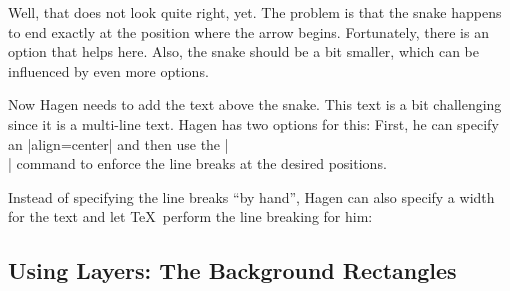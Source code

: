 Well, that does not look quite right, yet. The problem is that the snake
happens to end exactly at the position where the arrow begins. Fortunately,
there is an option that helps here. Also, the snake should be a bit smaller,
which can be influenced by even more options.
%
\begin{codeexample}[preamble={\usetikzlibrary{decorations.pathmorphing}}]
\end{codeexample}

Now Hagen needs to add the text above the snake. This text is a bit challenging
since it is a multi-line text. Hagen has two options for this: First, he can
specify an |align=center| and then use the |\\| command to enforce the line
breaks at the desired positions.
%
\begin{codeexample}[preamble={\usetikzlibrary{decorations.pathmorphing}}]
\end{codeexample}

Instead of specifying the line breaks ``by hand'', Hagen can also specify a
width for the text and let \TeX\ perform the line breaking for him:
%
\begin{codeexample}[preamble={\usetikzlibrary{decorations.pathmorphing}}]
\end{codeexample}


\subsection{Using Layers: The Background Rectangles}

